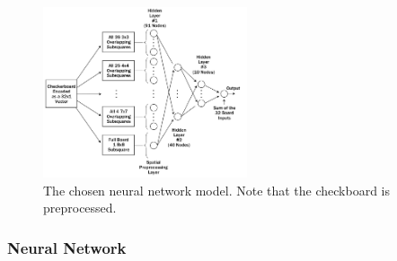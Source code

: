 \documentclass[12pt,a4paper]{article}
\begin{document}
    \begin{figure}[ht!]
        \centering
        \caption{The chosen neural network model. Note that the checkboard is preprocessed. \label{overflow}}
        \includegraphics[width=60mm]{nnmodel.png}
    \end{figure}

    
\subsubsection{Neural Network}
\end{document}
